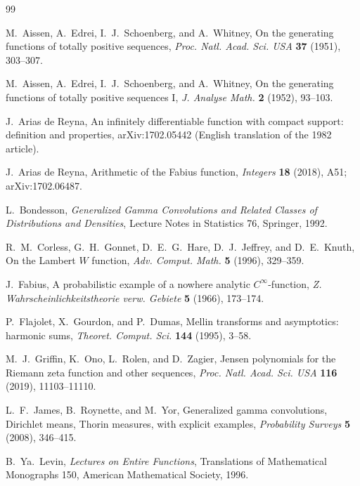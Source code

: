\documentclass[11pt]{article}
\theoremstyle{definition}
\theoremstyle{remark}
\begin{document}
\begingroup
\small
\begin{thebibliography}{99}

M.~Aissen, A.~Edrei, I.~J.~Schoenberg, and A.~Whitney,
\newblock On the generating functions of totally positive sequences,
\newblock \emph{Proc. Natl. Acad. Sci. USA} \textbf{37} (1951), 303--307.

M.~Aissen, A.~Edrei, I.~J.~Schoenberg, and A.~Whitney,
\newblock On the generating functions of totally positive sequences I,
\newblock \emph{J. Analyse Math.} \textbf{2} (1952), 93--103.

J.~Arias de Reyna,
\newblock An infinitely differentiable function with compact support: definition and properties,
\newblock arXiv:1702.05442 (English translation of the 1982 article).

J.~Arias de Reyna,
\newblock Arithmetic of the Fabius function,
\newblock \emph{Integers} \textbf{18} (2018), A51; arXiv:1702.06487.

L.~Bondesson,
\newblock \emph{Generalized Gamma Convolutions and Related Classes of Distributions and Densities},
\newblock Lecture Notes in Statistics 76, Springer, 1992.

R.~M.~Corless, G.~H.~Gonnet, D.~E.~G.~Hare, D.~J.~Jeffrey, and D.~E.~Knuth,
\newblock On the Lambert \(W\) function,
\newblock \emph{Adv. Comput. Math.} \textbf{5} (1996), 329--359.

J.~Fabius,
\newblock A probabilistic example of a nowhere analytic \(C^\infty\)-function,
\newblock \emph{Z. Wahrscheinlichkeitstheorie verw. Gebiete} \textbf{5} (1966), 173--174.

P.~Flajolet, X.~Gourdon, and P.~Dumas,
\newblock Mellin transforms and asymptotics: harmonic sums,
\newblock \emph{Theoret. Comput. Sci.} \textbf{144} (1995), 3--58.

M.~J.~Griffin, K.~Ono, L.~Rolen, and D.~Zagier,
\newblock Jensen polynomials for the Riemann zeta function and other sequences,
\newblock \emph{Proc. Natl. Acad. Sci. USA} \textbf{116} (2019), 11103--11110.

L.~F.~James, B.~Roynette, and M.~Yor,
\newblock Generalized gamma convolutions, Dirichlet means, Thorin measures, with explicit examples,
\newblock \emph{Probability Surveys} \textbf{5} (2008), 346--415.

B.~Ya.~Levin,
\newblock \emph{Lectures on Entire Functions},
\newblock Translations of Mathematical Monographs 150, American Mathematical Society, 1996.


\end{thebibliography}
\end{document}
